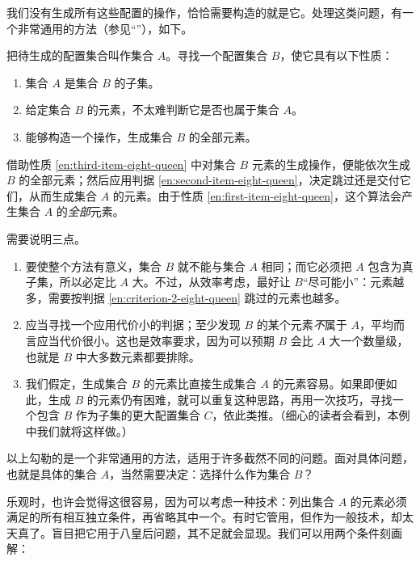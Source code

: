 \documentclass[twoside,11pt,fontset=none]{ctexbook}
\begin{document}
我们没有生成所有这些配置的操作，恰恰需要构造的就是它。处理这类问题，有一个非常通用的方法（参见“”），如下。

把待生成的配置集合叫作集合 $A$。寻找一个配置集合 $B$，使它具有以下性质：

\begin{enumerate}[wide, nosep, label=(\arabic*)]
	\item \label{en:first-item-eight-queen}
	集合 $A$ 是集合 $B$ 的子集。
	
	\item \label{en:second-item-eight-queen}
	给定集合 $B$ 的元素，不太难判断它是否也属于集合 $A$。
	
	\item \label{en:third-item-eight-queen}
	能够构造一个操作，生成集合 $B$ 的全部元素。
\end{enumerate}

借助性质 \ref{en:third-item-eight-queen} 中对集合 $B$ 元素的生成操作，便能依次生成 $B$ 的全部元素；然后应用判据 \ref{en:second-item-eight-queen}，决定跳过还是交付它们，从而生成集合 $A$ 的元素。由于性质 \ref{en:first-item-eight-queen}，这个算法会产生集合 $A$ 的\textit{全部}元素。

需要说明三点。

\begin{enumerate}[wide, nosep, label=(\arabic*)]
	\item 要使整个方法有意义，集合 $B$ 就不能与集合 $A$ 相同；而它必须把 $A$ 包含为真子集，所以必定比 $A$ 大。不过，从效率考虑，最好让 $B$“尽可能小”：元素越多，需要按判据 \ref{en:criterion-2-eight-queen} 跳过的元素也越多。
	
	\item \label{en:criterion-2-eight-queen}
	应当寻找一个应用代价小的判据；至少发现 $B$ 的某个元素\textit{不}属于 $A$，平均而言应当代价很小。这也是效率要求，因为可以预期 $B$ 会比 $A$ 大一个数量级，也就是 $B$ 中大多数元素都要排除。
	
	\item 我们假定，生成集合 $B$ 的元素比直接生成集合 $A$ 的元素容易。如果即便如此，生成 $B$ 的元素仍有困难，就可以重复这种思路，再用一次技巧，寻找一个包含 $B$ 作为子集的更大配置集合 $C$，依此类推。（细心的读者会看到，本例中我们就将这样做。）
\end{enumerate}

以上勾勒的是一个非常通用的方法，适用于许多截然不同的问题。面对具体问题，也就是具体的集合 $A$，当然需要决定：选择什么作为集合 $B$？

乐观时，也许会觉得这很容易，因为可以考虑一种技术：列出集合 $A$ 的元素必须满足的所有相互独立条件，再省略其中一个。有时它管用，但作为一般技术，却太天真了。盲目把它用于八皇后问题，其不足就会显现。我们可以用两个条件刻画解：
\end{document}
